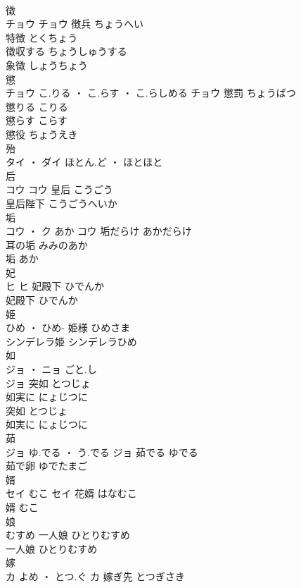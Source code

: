 \documentclass[8pt]{extreport}
\begin{document}
\begin{CJK}{UTF8}{min}
\\	徴	
\\	チョウ		チョウ	徴兵	ちょうへい	
\\	特徴	とくちょう	
\\	徴収する	ちょうしゅうする	
\\	象徴	しょうちょう	
\\	懲	
\\	チョウ	こ.りる ・ こ.らす ・ こ.らしめる	チョウ	懲罰	ちょうばつ	
\\	懲りる	こりる	
\\	懲らす	こらす	
\\	懲役	ちょうえき	
\\	殆	
\\	タイ ・ ダイ	ほとん.ど ・ ほとほと																																				
\\	后	
\\	コウ		コウ	皇后	こうごう	
\\	皇后陛下	こうごうへいか	
\\	垢	
\\	コウ ・ ク	あか	コウ	垢だらけ	あかだらけ	
\\	耳の垢	みみのあか	
\\	垢	あか	
\\	妃	
\\	ヒ		ヒ	妃殿下	ひでんか	
\\	妃殿下	ひでんか	
\\	姫	
\\	ひめ ・ ひめ-		姫様	ひめさま	
\\	シンデレラ姫	シンデレラひめ	
\\	如	
\\	ジョ ・ ニョ	ごと.し
\\	ジョ	突如	とつじょ	
\\	如実に	にょじつに	
\\	突如	とつじょ	
\\	如実に	にょじつに	
\\	茹	
\\	ジョ	ゆ.でる ・ う.でる	ジョ	茹でる	ゆでる	
\\	茹で卵	ゆでたまご	
\\	婿	
\\	セイ	むこ	セイ	花婿	はなむこ	
\\	婿	むこ	
\\	娘	
\\	むすめ		一人娘	ひとりむすめ	
\\	一人娘	ひとりむすめ	
\\	嫁	
\\	カ	よめ ・ とつ.ぐ	カ	嫁ぎ先	とつぎさき	

\end{CJK}
\end{document}
